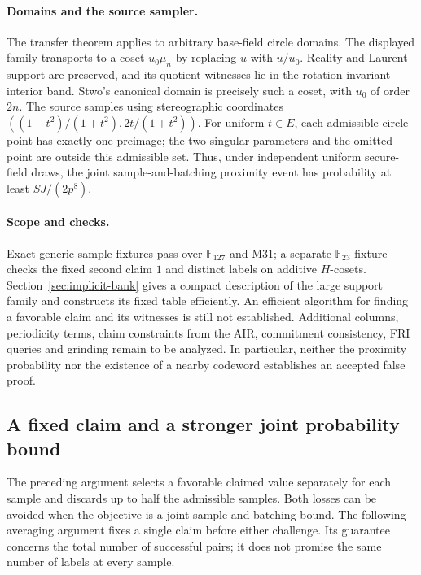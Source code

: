 \documentclass[11pt,letterpaper]{article}
\theoremstyle{definition}
\theoremstyle{remark}
\begin{document}
\paragraph{Domains and the source sampler.}
The transfer theorem applies to arbitrary base-field circle domains.
The displayed family transports to a coset $u_0\mu_n$ by replacing
$u$ with $u/u_0$. Reality and Laurent support are preserved, and its
quotient witnesses lie in the rotation-invariant interior band.
Stwo's canonical domain is precisely such a coset, with $u_0$ of
order $2n$. The source samples using stereographic coordinates
$((1-t^2)/(1+t^2),2t/(1+t^2))$. For uniform $t\in E$, each admissible
circle point has exactly one preimage; the two singular parameters
and the omitted point are outside this admissible set. Thus, under
independent uniform secure-field draws, the joint sample-and-batching
proximity event has probability at least $SJ/(2p^8)$.

\paragraph{Scope and checks.}
Exact generic-sample fixtures pass over $\mathbb F_{127}$ and M31;
a separate $\mathbb F_{23}$ fixture checks the fixed second claim $1$
and distinct labels on additive $H$-cosets. Section~\ref{sec:implicit-bank} gives a compact description of the
large support family and constructs its fixed table efficiently. An
efficient algorithm for finding a favorable claim and its witnesses
is still not established. Additional
columns, periodicity terms, claim constraints from the AIR, commitment
consistency, FRI queries and grinding remain to be analyzed. In
particular, neither the proximity probability nor the existence of a
nearby codeword establishes an accepted false proof.


\subsection{A fixed claim and a stronger joint probability bound}
\label{sec:fixed-claim-transfer}

The preceding argument selects a favorable claimed value separately for
each sample and discards up to half the admissible samples. Both losses
can be avoided when the objective is a joint sample-and-batching bound.
The following averaging argument fixes a single claim before either
challenge. Its guarantee concerns the total number of successful pairs;
it does not promise the same number of labels at every sample.
\end{document}
